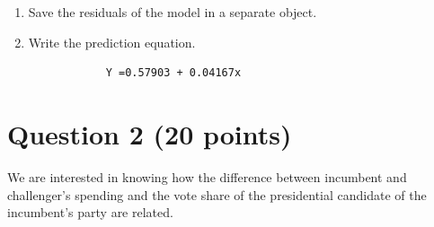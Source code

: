 \documentclass[12pt,letterpaper]{article}
\begin{document}
\begin{enumerate}
		\item Save the residuals of the model in a separate object.	
		
		
		\item Write the prediction equation.
			\begin{verbatim}
			Y =0.57903 + 0.04167x
			\end{verbatim}
	\end{enumerate}
	
\newpage

\section*{Question 2 (20 points)}
\noindent We are interested in knowing how the difference between incumbent and challenger's spending and the vote share of the presidential candidate of the incumbent's party are related.	\vspace{.25cm}
\end{document}
